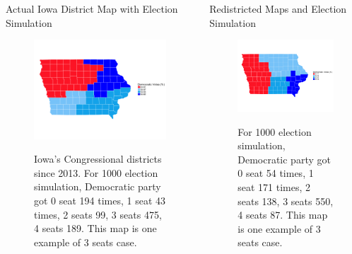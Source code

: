 \documentclass[leqno, handout]{beamer}
\theoremstyle{definition}
\begin{document}
\begin{frame}
\begin{columns}[t]
\begin{column}{.45\linewidth}
\begin{columns}[t]
\begin{column}{.48\linewidth}
\begin{block}{Actual Iowa District Map with Election Simulation}
\begin{figure}
		\includegraphics[width=25cm]{actual.png}\\
		\caption{Iowa's Congressional districts since 2013. For 1000 election simulation, Democratic party got 0 seat 194 times, 1 seat 43 times, 2 seats 99, 3 seats 475, 4 seats 189. This map is one example of 3 seats case.}
		\end{figure}

\end{block}
\end{column}


\begin{column}[t]{.48\linewidth}
\begin{block}{Redistricted Maps and Election Simulation}
\vspace{1ex}
\begin{figure}
		\includegraphics[width=25cm]{redistricting990.png}\\
		\caption{For 1000 election simulation, Democratic party got 0 seat 54 times, 1 seat 171 times, 2 seats 138, 3 seats 550, 4 seats 87. This map is one example of 3 seats case. }
		\end{figure}


\end{block}
\end{column}
\end{columns}
\end{column}
\end{columns}
\end{frame}
\end{document}
